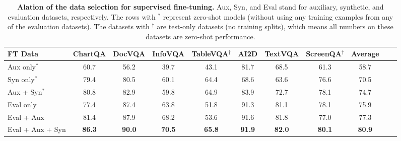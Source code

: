 \begin{table*}[!t]
    \small
    \centering
    \begin{tabular}{lcccccccccc}
        \toprule
        \textbf{FT Data} & \textbf{ChartQA} & \textbf{DocVQA} & \textbf{InfoVQA} & \textbf{TableVQA}$^\dagger$ & \textbf{AI2D} & \textbf{TextVQA} & \textbf{ScreenQA}$^\dagger$ & \textbf{Average} \\
        \midrule
        Aux only$^*$ & 60.7 & 56.2 & 39.7 & 43.1 & 81.7 & 68.5 & 61.3 & 58.7\\
        Syn only$^*$ & 79.4 & 80.5 & 60.1 & 64.4 & 68.6 & 63.6 & 76.6 & 70.5\\
        Aux + Syn$^*$ & 80.8 & 82.9 & 59.8 & 64.9 & 83.9 & 72.7 & 78.1 & 74.7\\ \midrule
        Eval only & 77.4 & 87.4 & 63.8 & 51.8 & 91.3 & 81.1 & 78.1 & 75.9 \\
        Eval + Aux & 81.4 & 87.9 & 68.2 & 53.6 & 91.6 & 81.8 & 77.0 & 77.3\\
        Eval + Aux + Syn & \textbf{86.3} & \textbf{90.0} & \textbf{70.5} & \textbf{65.8} & \textbf{91.9} & \textbf{82.0} & \textbf{80.1} & \textbf{80.9}\\
        \bottomrule
    \end{tabular}
    \vspace{-.1cm}
    \caption{\textbf{Alation of the data selection for supervised fine-tuning.} Aux, Syn, and Eval stand for auxiliary, synthetic, and evaluation datasets, respectively. The rows with $^*$ represent zero-shot models (without using any training examples from any of the evaluation datasets). The datasets with $^\dagger$ are test-only datasets (no training splits), which means all numbers on these datasets are zero-shot performance.}
    \label{tab:train_data_ablation}
    \vspace{-.3cm}
\end{table*}

